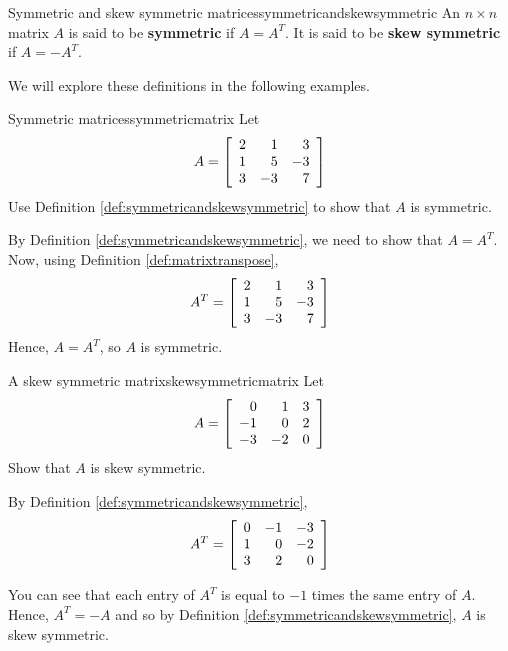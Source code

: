\begin{definition}{Symmetric and skew symmetric matrices}{symmetricandskewsymmetric}
An $n\times n$ matrix $A$ is said to be
\textbf{symmetric} if $A=A^{T}.$ It is said to be
\textbf{skew symmetric} if $A=-A^{T}.$
\end{definition}

We will explore these definitions in the following examples.

\begin{example}{Symmetric matrices}{symmetricmatrix}
Let
\begin{equation*}
A=\left[
\begin{array}{rrr}
2 & 1 & 3 \\
1 & 5 & -3 \\
3 & -3 & 7
\end{array}
\right] 
\end{equation*}
Use Definition \ref{def:symmetricandskewsymmetric} to show that $A$ is symmetric. 
\end{example}

\begin{solution}
By Definition \ref{def:symmetricandskewsymmetric}, we need to show that $A = A^T$. 
Now, using Definition \ref{def:matrixtranspose}, 
\begin{equation*}
A^{T} = \left[
\begin{array}{rrr}
2 & 1 & 3 \\
1 & 5 & -3 \\
3 & -3 & 7
\end{array}
\right]
\end{equation*}
Hence, $A = A^{T}$, so $A$ is symmetric.
\end{solution}

\begin{example}{A skew symmetric matrix}{skewsymmetricmatrix}
Let
\begin{equation*}
A=\left[
\begin{array}{rrr}
0 & 1 & 3 \\
-1 & 0 & 2 \\
-3 & -2 & 0
\end{array}
\right] 
\end{equation*}
Show that $A$ is skew symmetric.
\end{example}

\begin{solution} By Definition \ref{def:symmetricandskewsymmetric}, 
\begin{equation*}
A^{T} = \left[
\begin{array}{rrr}
0 & -1 & -3\\
1 &  0 & -2\\
3 &  2 &  0
\end{array}
\right] 
\end{equation*}

You can see that each entry of $A^T$ is equal to $-1$ times the same entry of $A$. 
Hence, $A^{T} = - A$ and so by Definition \ref{def:symmetricandskewsymmetric}, $A$ is skew symmetric. 
\end{solution}
